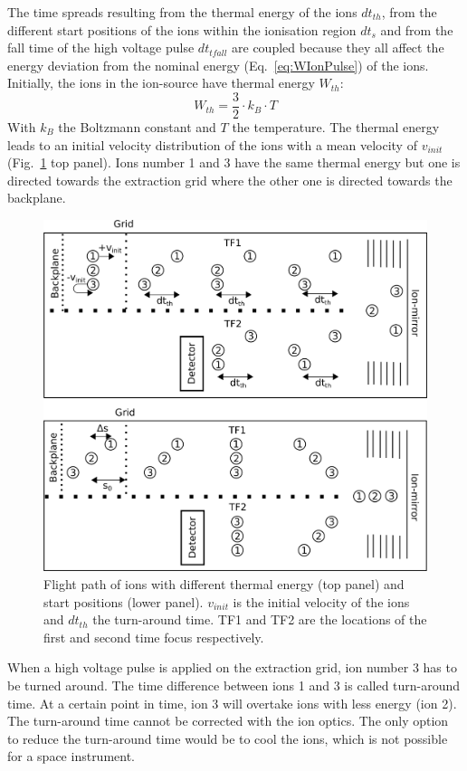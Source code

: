 	The time spreads resulting from the thermal energy of the ions $dt_{th}$, from the different start positions of the ions within the ionisation region $dt_s$ and from the fall time of the high voltage pulse $dt_{tfall}$ are coupled because they all affect the energy deviation from the nominal energy (Eq.~\eqref{eq:WIonPulse}) of the ions. Initially, the ions in the ion-source have thermal energy $W_{th}$:
	\begin{equation}
		W_{th} = \frac{3}{2}\cdot k_B \cdot T
	\end{equation}
	With $k_B$ the Boltzmann constant and $T$ the temperature. The thermal energy leads to an initial velocity distribution of the ions with a mean velocity of $v_{init}$ (Fig.~\ref{fig:thISStartPosThermEn} top panel). Ions number 1 and 3 have the same thermal energy but one is directed towards the extraction grid where the other one is directed towards the backplane. 
	\begin{figure}[H] %
		\centering
		\includegraphics[width= .9\textwidth]{Bilder/ISStartPosThermEn.png}
		\caption{Flight path of ions with different thermal energy (top panel) and start positions (lower panel). $v_{init}$ is the initial velocity of the ions and $dt_{th}$ the turn-around time. TF1 and TF2 are the locations of the first and second time focus respectively.}
		\label{fig:thISStartPosThermEn}
	\end{figure}
	When a high voltage pulse is applied on the extraction grid, ion number 3 has to be turned around. The time difference between ions 1 and 3 is called turn-around time. At a certain point in time, ion 3 will overtake ions with less energy (ion 2). The turn-around time cannot be corrected with the ion optics. The only option to reduce the turn-around time would be to cool the ions, which is not possible for a space instrument.\\
